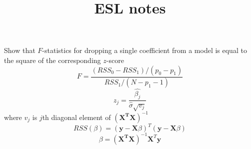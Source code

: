 \documentclass{article}
\title{ESL notes}
\begin{document}
\alpha
Show that $F$-statistics for dropping a single coeﬃcient from a model is equal to the square of the corresponding $z$-score
$$F=\frac{(RSS_0-RSS_1)/(p_0-p_1)}{RSS_1/(N-p_1-1)}$$
$$ z_j = \frac{\hat{\beta_j} }{\hat{\sigma}\sqrt{v_j} }$$
where $v_j$ is $ j$th diagonal element of $(\mathbf{X^T} \mathbf{X})^{-1}$
$$RSS(\beta)=(\mathbf{y}-\mathbf{X}\beta)^T(\mathbf{y}-\mathbf{X}\beta) $$
\begin{equation}
    \beta = (\mathbf{X^T} \mathbf{X})^{-1}\mathbf{X}^T\mathbf{y}
    \label{eq:}
\end{equation} 
\end{document}
